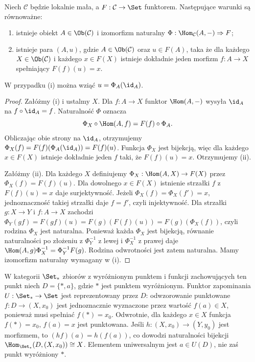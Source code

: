 \begin{twierdzenie}\label{tw:univ-element}
Niech $\mathcal C$ będzie lokalnie mała, a $F:\mathcal C\to\Set$ funktorem. Następujące warunki są równoważne:
\begin{enumerate}[label=(\roman*)]
\item istnieje obiekt $A\in\Ob(\mathcal C)$ i izomorfizm naturalny $\Phi:\Hom_{\mathcal C}(A,-)\Rightarrow F$;
\item istnieje para $(A,u)$, gdzie $A\in\Ob(\mathcal C)$ oraz $u\in F(A)$, taka że dla każdego $X\in\Ob(\mathcal C)$ i każdego $x\in F(X)$ istnieje dokładnie jeden morfizm $f:A\to X$ spełniający $F(f)(u)=x$.
\end{enumerate}
W przypadku (i) można wziąć $u=\Phi_A(\id_A)$.
\end{twierdzenie}
\begin{proof}
Załóżmy (i) i ustalmy $X$. Dla $f:A\to X$ funktor $\Hom(A,-)$ wysyła $\id_A$ na $f\circ\id_A=f$. Naturalność $\Phi$ oznacza
\[
\Phi_X\circ\Hom(A,f)=F(f)\circ\Phi_A.
\]
Obliczając obie strony na $\id_A$, otrzymujemy $\Phi_X(f)=F(f)(\Phi_A(\id_A))=F(f)(u)$. Funkcja $\Phi_X$ jest bijekcją, więc dla każdego $x\in F(X)$ istnieje dokładnie jeden $f$ taki, że $F(f)(u)=x$. Otrzymujemy (ii).

Załóżmy (ii). Dla każdego $X$ definiujemy $\Phi_X:\Hom(A,X)\to F(X)$ przez $\Phi_X(f)=F(f)(u)$. Dla dowolnego $x\in F(X)$ istnienie strzałki $f$ z $F(f)(u)=x$ daje surjektywność. Jeżeli $\Phi_X(f)=\Phi_X(f')=x$, jednoznaczność takiej strzałki daje $f=f'$, czyli injektywność. Dla strzałki $g:X\to Y$ i $f:A\to X$ zachodzi $\Phi_Y(gf)=F(gf)(u)=F(g)(F(f)(u))=F(g)(\Phi_X(f))$, czyli rodzina $\Phi_X$ jest naturalna. Ponieważ każda $\Phi_X$ jest bijekcją, równanie naturalności po złożeniu z $\Phi_Y^{-1}$ z lewej i $\Phi_X^{-1}$ z prawej daje $\Hom(A,g)\Phi_X^{-1}=\Phi_Y^{-1}F(g)$. Rodzina odwrotności jest zatem naturalna. Mamy izomorfizm naturalny wymagany w (i).
\end{proof}



\begin{przyklad}
W kategorii $\Set_*$ zbiorów z wyróżnionym punktem i funkcji zachowujących ten punkt niech $D=\{*,a\}$, gdzie $*$ jest punktem wyróżnionym. Funktor zapominania $U:\Set_*\to\Set$ jest reprezentowany przez $D$: odwzorowanie punktowane $f:D\to(X,x_0)$ jest jednoznacznie wyznaczone przez wartość $f(a)\in X$, ponieważ musi spełniać $f(*)=x_0$. Odwrotnie, dla każdego $x\in X$ funkcja $f(*)=x_0$, $f(a)=x$ jest punktowana. Jeśli $h:(X,x_0)\to(Y,y_0)$ jest morfizmem, to $(hf)(a)=h(f(a))$, co dowodzi naturalności bijekcji $\Hom_{\Set_*}(D,(X,x_0))\cong X$. Elementem uniwersalnym jest $a\in U(D)$, nie zaś punkt wyróżniony $*$.
\end{przyklad}

